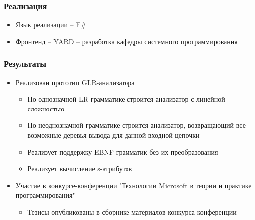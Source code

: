 \documentclass{beamer}
\begin{document}
\begin{frame}
    \transwipe[direction=90]
    \frametitle{Реализация}
    \begin{itemize}
        \item Язык реализации -- F\#
    \item Фронтенд -- YARD -- разработка кафедры системного программирования
    \end{itemize}   
\end{frame}


\begin{frame}
    \transwipe[direction=90]
    \frametitle{Результаты}
    \begin{itemize}
    \item Реализован прототип GLR-анализатора
    \begin{itemize}
        \item По однозначной LR-грамматике строится анализатор с линейной сложностью
        \item По неоднозначной грамматике строится анализатор, возвращающий все возможные деревья вывода для данной входной цепочки
        \item Реализует поддержку EBNF-грамматик без их преобразования
        \item Реализует вычисление s-атрибутов
    \end{itemize}
    \item  Участие в конкурсе-конференции "Технологии Microsoft в теории и практике программирования"
    \begin{itemize}
        \item Тезисы опубликованы в сборнике материалов конкурса-конференции   
    \end{itemize}   
    \end{itemize}   
\end{frame}
\end{document}
